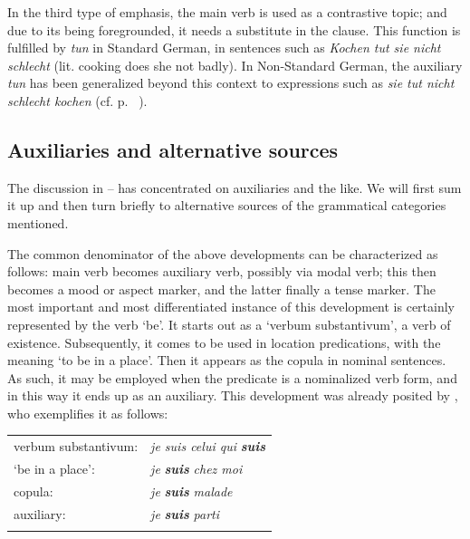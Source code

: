 \label{page35}In the third type of emphasis, the main verb is used as a contrastive topic; and due to its being foregrounded, it needs a substitute in the clause. This function is fulfilled by \textit{tun} in Standard German, in sentences such as \textit{Kochen tut sie nicht schlecht} (lit. cooking does she not badly). In Non-Standard German, the auxiliary \textit{tun} has been generalized beyond this context to expressions such as \textit{sie tut nicht schlecht kochen} (cf. p.~\pageref{page123}\chk%
).

\subsection{Auxiliaries and alternative sources} \label{sec:3.1.6}

The discussion in -- has concentrated on auxiliaries and the like. We will first sum it up and then turn briefly to alternative sources of the grammatical categories mentioned.

The common denominator of the above developments can be characterized as follows: main verb becomes auxiliary verb, possibly via modal verb; this then becomes a mood or aspect marker, and the latter finally a tense marker. The most important and most differentiated instance of this development is certainly represented by the verb ‘be’. It starts out as a ‘verbum substantivum’, a verb of existence. Subsequently, it comes to be used in location predications, with the meaning ‘to be in a place’. Then it appears as the copula in nominal sentences. As such, it may be employed when the predicate is a nominalized verb form, and in this way it ends up as an auxiliary. This development was already posited by \citet[131]{Meillet1912}, who exemplifies it as follows:

\begin{table}
\begin{tabular}{ll}
\lsptoprule
verbum substantivum: & \textit{je suis celui qui }\textbf{\textit{suis}}\\
‘be in a place’: & \textit{je }\textbf{\textit{suis}}\textit{ chez moi}\\
copula: & \textit{je }\textbf{\textit{suis}}\textit{ malade}\\
auxiliary: & \textit{je }\textbf{\textit{suis}}\textit{ parti}\\
\lspbottomrule
\end{tabular}
\end{table}


